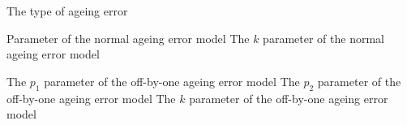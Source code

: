 \par{}\par\par
{} {The type of ageing error}
\par\textbf{}\par
\par\textbf{}\par
{} {Parameter of the normal ageing error model}
 {The $k$ parameter of the normal ageing error model}
\par\textbf{}\par
{} {The $p_1$ parameter of the off-by-one ageing error model}
 {The $p_2$ parameter of the off-by-one ageing error model}
 {The $k$ parameter of the off-by-one ageing error model}
